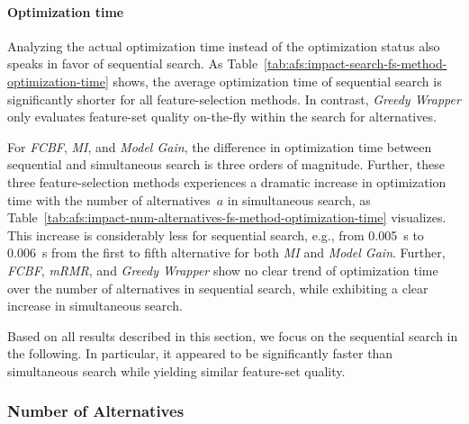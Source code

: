 \documentclass{article}
\theoremstyle{definition}
\begin{document}
\paragraph{Optimization time}

Analyzing the actual optimization time instead of the optimization status also speaks in favor of sequential search.
As Table~\ref{tab:afs:impact-search-fs-method-optimization-time} shows, the average optimization time of sequential search is significantly shorter for all feature-selection methods.
In contrast, \emph{Greedy Wrapper} only evaluates feature-set quality on-the-fly within the search for alternatives.

For \emph{FCBF}, \emph{MI}, and \emph{Model Gain}, the difference in optimization time between sequential and simultaneous search is three orders of magnitude.
Further, these three feature-selection methods experiences a dramatic increase in optimization time with the number of alternatives~$a$ in simultaneous search, as Table~\ref{tab:afs:impact-num-alternatives-fs-method-optimization-time} visualizes.
This increase is considerably less for sequential search, e.g., from 0.005~s to 0.006~s from the first to fifth alternative for both \emph{MI} and \emph{Model Gain}.
Further, \emph{FCBF}, \emph{mRMR}, and \emph{Greedy Wrapper} show no clear trend of optimization time over the number of alternatives in sequential search, while exhibiting a clear increase in simultaneous search.

Based on all results described in this section, we focus on the sequential search in the following.
In particular, it appeared to be significantly faster than simultaneous search while yielding similar feature-set quality.

\subsubsection{Number of Alternatives}
\label{sec:afs:evaluation:search:num-alternatives}
\end{document}
